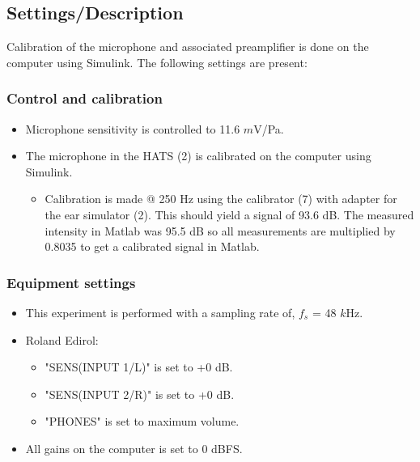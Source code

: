 \subsection{Settings/Description}
\label{SettingsCacellationPath}

Calibration of the microphone and associated preamplifier is done on the computer using Simulink. The following settings are present:

\subsubsection{Control and calibration}
\begin{itemize}
	\item Microphone sensitivity is controlled to 11.6 $m$V/Pa.
	\item The microphone in the HATS (2) is calibrated on the computer using Simulink.
	\begin{itemize} 
		\item Calibration is made @ 250 Hz using the calibrator (7) with adapter for the ear simulator (2). This should yield a signal of 93.6 dB. The measured intensity in Matlab was 95.5 dB so all measurements are multiplied by 0.8035 to get a calibrated signal in Matlab.
	\end{itemize}
\end{itemize}

\subsubsection{Equipment settings}
\begin{itemize}
	\item This experiment is performed with a sampling rate of, $f_{s}$ = 48 $k$Hz.
	\item Roland Edirol:
		\begin{itemize}
			\item "SENS(INPUT 1/L)" is set to +0 dB.
			\item "SENS(INPUT 2/R)" is set to +0 dB.
			\item "PHONES" is set to maximum volume. 
		\end{itemize}		
	\item All gains on the computer is set to 0 dBFS.
\end{itemize}


